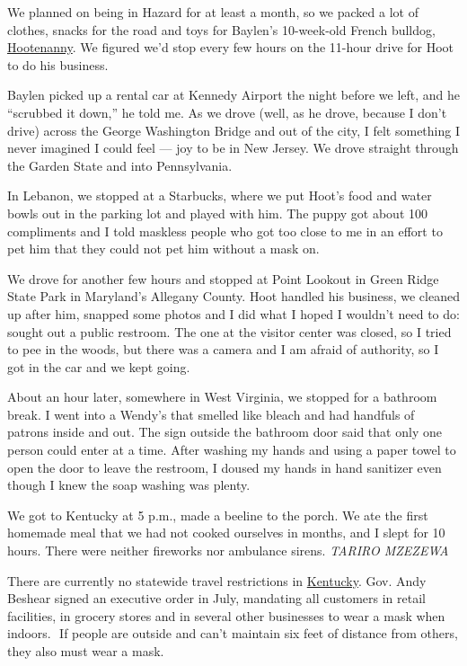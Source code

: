 We planned on being in Hazard for at least a month, so we packed a lot
of clothes, snacks for the road and toys for Baylen's 10-week-old French
bulldog, \href{https://www.instagram.com/hootboyblue/}{Hootenanny}. We
figured we'd stop every few hours on the 11-hour drive for Hoot to do
his business.

Baylen picked up a rental car at Kennedy Airport the night before we
left, and he ``scrubbed it down,'' he told me. As we drove (well, as he
drove, because I don't drive) across the George Washington Bridge and
out of the city, I felt something I never imagined I could feel --- joy
to be in New Jersey. We drove straight through the Garden State and into
Pennsylvania.

In Lebanon, we stopped at a Starbucks, where we put Hoot's food and
water bowls out in the parking lot and played with him. The puppy got
about 100 compliments and I told maskless people who got too close to me
in an effort to pet him that they could not pet him without a mask on.

We drove for another few hours and stopped at Point Lookout in Green
Ridge State Park in Maryland's Allegany County. Hoot handled his
business, we cleaned up after him, snapped some photos and I did what I
hoped I wouldn't need to do: sought out a public restroom. The one at
the visitor center was closed, so I tried to pee in the woods, but there
was a camera and I am afraid of authority, so I got in the car and we
kept going.

About an hour later, somewhere in West Virginia, we stopped for a
bathroom break. I went into a Wendy's that smelled like bleach and had
handfuls of patrons inside and out. The sign outside the bathroom door
said that only one person could enter at a time. After washing my hands
and using a paper towel to open the door to leave the restroom, I doused
my hands in hand sanitizer even though I knew the soap washing was
plenty.

We got to Kentucky at 5 p.m., made a beeline to the porch. We ate the
first homemade meal that we had not cooked ourselves in months, and I
slept for 10 hours. There were neither fireworks nor ambulance sirens.
\emph{TARIRO MZEZEWA}

There are currently no statewide travel restrictions in
\href{https://www.nytimes3xbfgragh.onion/interactive/2020/us/kentucky-coronavirus-cases.html}{Kentucky}.
Gov. Andy Beshear signed an executive order in July, mandating all
customers in retail facilities​, in​ grocery stores and in several other
businesses to wear a mask when indoors. ​ If people are outside and
can't maintain six feet of distance from others, they also ​must wear a
mask.

